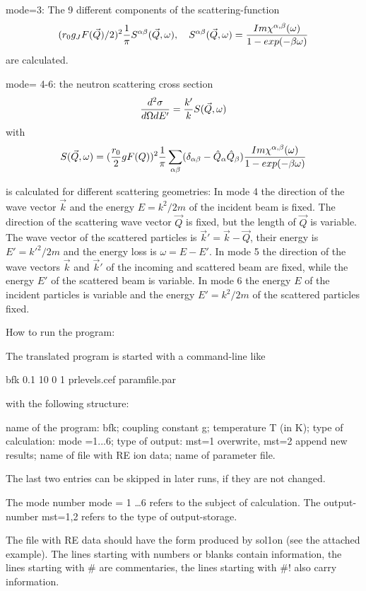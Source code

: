 mode=3: The 9 different components of the scattering-function 
$$
(r_0g_JF(\vec Q)/2)^2{1\over \pi} S^{\alpha\beta}(\vec Q,\omega), \quad 
S^{\alpha\beta}(\vec Q,\omega)= {Im \chi^{\alpha,\beta}(\omega)\over
1-exp(-\beta\omega)}
$$
are  calculated. 

mode= 4-6: the neutron scattering cross section
$$
{d^2\sigma \over d\Omega d E'} =  {k' \over
k}S(\vec Q,\omega)
$$
with
$$
S(\vec Q, \omega)=({r_0\over 2}g F(Q))^2{1\over \pi }
\sum_{\alpha\beta}(\delta_{\alpha\beta} 
- \hat Q_\alpha \hat Q_\beta)
{Im \chi^{\alpha,\beta}(\omega)\over 1-exp(-\beta \omega)} 
$$

is  calculated for different scattering geometries:
In mode 4 the  
direction of the wave vector $\vec k$ and the energy $E=k^2/2m$ of the
incident 
beam is fixed. The direction of the scattering wave vector $\vec Q$ is fixed, 
but the 
length of $\vec Q$ is variable. The wave vector of the scattered
particles is  $\vec k'=\vec k-\vec Q$, their energy is $E'=k'^2/2m$ and
the energy loss is $\omega =E-E'$. In mode 5 the direction  of the wave vectors 
$\vec k$ and $\vec k'$ of the incoming and scattered beam
are fixed, while the energy $E'$ of the scattered beam is variable. In mode
6
the energy $E$ of the incident particles is variable 
and the energy $E'=k^2/2m$ of the scattered particles  fixed.  

\newpage
{\large How to run the program:}

\bigskip
The translated program is started with a command-line 
like 

bfk 0.1 10 0 1 prlevels.cef paramfile.par


with  the following
structure:

name of the program: bfk;  coupling constant g; temperature T (in K); type of
calculation: mode =1...6; type of output: mst=1 overwrite, mst=2 append new
results;  name of file with RE ion data; name of parameter file.

\medskip

The last two entries can be skipped in later runs, if they are not changed.

The mode number mode = 1 \dots 6
refers to the subject of calculation. The output- number 
mst=1,2 refers to the type of output-storage.

\medskip
The file with RE data should have the  form produced by sol1on (see the attached example). 
The
lines starting with numbers or blanks contain information, the lines
starting with \# are commentaries, the lines starting with  \#! also carry
information.


